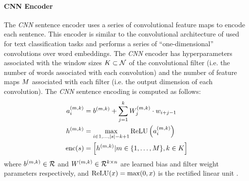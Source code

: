 
\paragraph{CNN Encoder} The \textit{CNN} sentence encoder uses a series of 
convolutional feature maps to encode each sentence. This encoder is similar
to the convolutional architecture of \cite{kim} used for text classification
tasks and performs a series of ``one-dimensional'' convolutions over 
word embeddings. 
The \textit{CNN} encoder has hyperparameters
associated with the window sizes $K \subset \mathcal{N}$ of the convolutional filter 
(i.e. the number of words associated with each convolution) and the number of 
feature maps $M$ associated with each filter
(i.e. the output dimension of each 
convolution). 
The \textit{CNN} sentence encoding is computed as follows:
\begin{align}
 a^{(m,k)}_i &= b^{(m,k)} 
    + \sum^k_{j=1} W^{(m,k)}_j \cdot w_{i + j -1}\\
  h^{(m,k)} &= \max_{i\in 1,\dots, |s| - k + 1} 
                      \operatorname{ReLU}\left(a^{(m,k)}_i\right) \\
 \operatorname{enc}(s) &= \left[h^{(m,k)} | 
   m \in \{1, \ldots, M\},
   k \in K
   \right]
\end{align}
where $b^{(m,k)}\in\mathcal{R}$ and $W^{(m,k)} \in 
\mathcal{R}^{k \times n}$ are learned bias and filter
weight parameters respectively, and $\operatorname{ReLU}(x) = \max(0, x)$ is the rectified
linear unit \cite{relu}.



